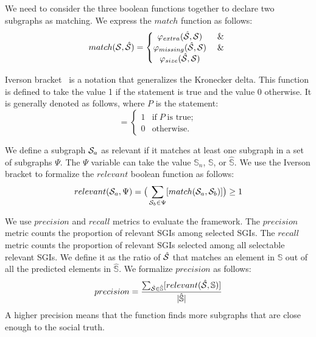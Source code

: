 \documentclass{llncs}
\begin{document}
We need to consider the three boolean functions together to declare two subgraphs as matching.
We express the \(match\) function as follows:
\begin{equation}
match({\cal{S}},\hat{\cal{S}}) =
\left\{
\begin{matrix}
\varphi_{extra}(\hat{\cal S}, {\cal S})   & \And \\
\varphi_{missing}(\hat{\cal S}, {\cal S}) & \And \\
\varphi_{size}(\hat{\cal S}, {\cal S})
\end{matrix}
\right.
\end{equation}

Iverson bracket~\cite{Iverson1962} is a notation that generalizes the Kronecker delta.
This function is defined to take the value 1 if the statement is true and the value 0 otherwise.
It is generally denoted as follows, where \(P\) is the statement:
\begin{equation}
[P] =
\left\{
\begin{matrix}
1 & \text{if} \;P\; \text{is true}; \\
0 & \text{otherwise}.
\end{matrix}
\right.
\end{equation}

We define a subgraph \({\cal{S}}_a\) as relevant if it matches at least one subgraph in a set of subgraphs \(\Psi\).
The \(\Psi\) variable can take the value \(\mathbb{S}_n\), \(\mathbb{S}\), or \(\hat{\mathbb{S}}\).
We use the Iverson bracket to formalize the \(relevant\) boolean function as follows:
\begin{equation}
relevant({\cal{S}}_a,\Psi) = \big(\sum_{{\cal{S}}_b \in \Psi} [match({\cal{S}}_a,{\cal{S}}_b)]\big) \geq 1
\end{equation}

We use \(precision\) and \(recall\) metrics to evaluate the framework.
The \(precision\) metric counts the proportion of relevant SGIs among selected SGIs.
The \(recall\) metric counts the proportion of relevant SGIs selected among all selectable relevant SGIs.
We define it as the ratio of \(\hat{\cal{S}}\) that matches an element in \(\mathbb{S}\) out of all the predicted elements in \(\hat{\mathbb{S}}\).
We formalize \(precision\) as follows:
\begin{equation}
precision = \frac{\sum_{\hat{\cal{S}} \in \hat{\mathbb{S}}}[relevant(\hat{\cal{S}}, \mathbb{S})] }{|\hat{\mathbb{S}}|}
\end{equation}
A higher precision means that the function finds more subgraphs that are close enough to the social truth.
\end{document}
